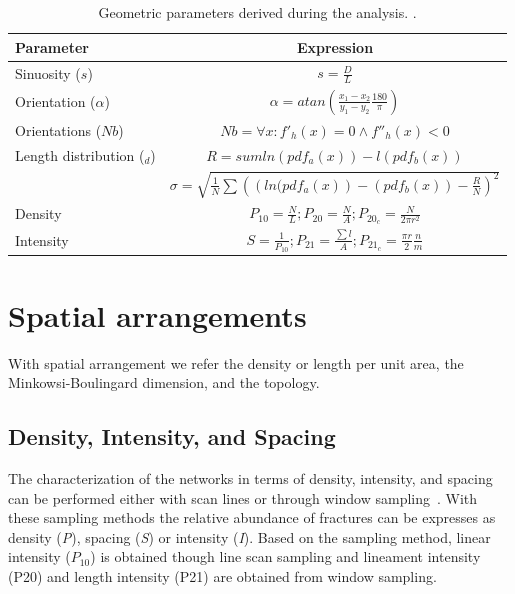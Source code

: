 \documentclass[a4paper,fleqn]{cas-sc}
\begin{document}
\begin{table}[width=.75\linewidth,cols=2,pos=h]
\caption{Geometric parameters derived during the analysis. .}\label{tbl01}
	\begin{tabular*}{\tblwidth}{@{} LC@{} }
		\toprule
		Parameter & Expression\\
		\midrule
		Sinuosity ($s$) 			& $s = \frac{D}{L}$\\
		Orientation ($\alpha$) 		& $\alpha = atan\left( \frac{x_1 - x_2}{y_1 - y_2} \frac{180}{\pi} \right)$\\
		Orientations ($Nb$) 		& $Nb = \forall x: f'_h(x) = 0 \land f''_h(x) < 0 $\\
		Length distribution ($_d$) 	& $R = sum ln \left( pdf_a(x) \right) - l \left( pdf_b(x) \right) $ \\
									& $\sigma = \sqrt{\frac{1}{N} \sum \left( \left( ln(pdf_a(x) \right) - \left( pdf_b(x) \right) - \frac{R}{N} \right)^2}$\\
		Density  					& $P_{10} = \frac{N}{L}; P_{20} = \frac{N}{A}; P_{20_c} = \frac{N}{2\pi r^2}$\\
		Intensity  					& $S = \frac{1}{P_{10}}; P_{21} = \frac{\sum l}{A}; P_{21_c} = \frac{\pi r}{2} \frac{n}{m}$\\
		\bottomrule
	\end{tabular*}
\end{table}

\section{Spatial arrangements}
With spatial arrangement we refer the density or length per unit area, the Minkowsi-Boulingard dimension, and the topology.

\subsection{Density, Intensity, and Spacing}
The characterization of the networks in terms of density, intensity, and spacing can be performed either with scan lines or through window sampling~\citep{Zeeb2013, Watkins2015, Sanderson2019}. With these sampling methods the relative abundance of fractures can be expresses as density (\textit{P}), spacing (\textit{S}) or intensity (\textit{I}). Based on the sampling method, linear intensity ($P_{10}$) is obtained though line scan sampling and lineament intensity (P20) and length intensity (P21) are obtained from window sampling.
\end{document}
